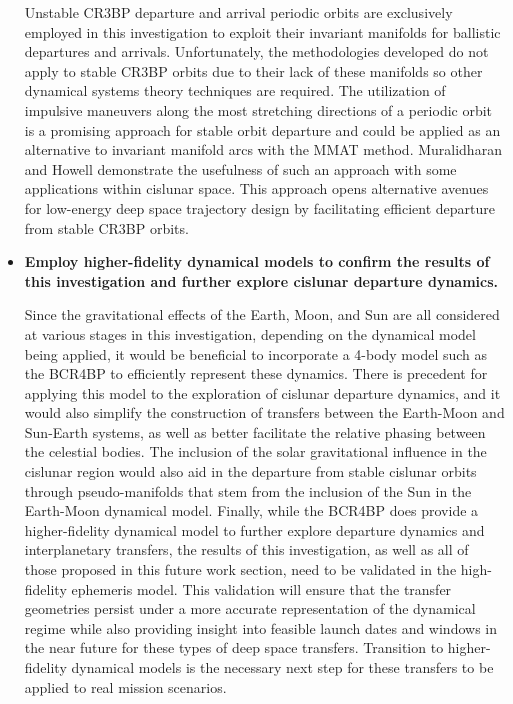\begin{itemize}
            Unstable CR3BP departure and arrival periodic orbits are exclusively employed in this
            investigation to exploit their invariant manifolds for ballistic departures and
            arrivals. Unfortunately, the methodologies developed do not apply to stable CR3BP
            orbits due to their lack of these manifolds so other dynamical systems theory
            techniques are required. The utilization of impulsive maneuvers along the most
            stretching directions of a periodic orbit is a promising approach for stable orbit
            departure and could be applied as an alternative to invariant manifold arcs with the
            MMAT method. Muralidharan and Howell demonstrate the usefulness of such an approach
            with some applications within cislunar space\cite{Muralidharan:2022}. This approach
            opens alternative avenues for low-energy deep space trajectory design by facilitating
            efficient departure from stable CR3BP orbits.
    \item   \textbf{Employ higher-fidelity dynamical models to confirm the results of this
            investigation and further explore cislunar departure dynamics.}

            Since the gravitational effects of the Earth, Moon, and Sun are all considered at
            various stages in this investigation, depending on the dynamical model being applied,
            it would be beneficial to incorporate a 4-body model such as the BCR4BP to efficiently
            represent these dynamics. There is precedent for applying this model to the exploration
            of cislunar departure dynamics, and it would also simplify the construction of
            transfers between the Earth-Moon and Sun-Earth systems, as well as better facilitate
            the relative phasing between the celestial bodies\cite{Boudad:2021,Boudad:2022}. The
            inclusion of the solar gravitational influence in the cislunar region would also aid in
            the departure from stable cislunar orbits through pseudo-manifolds that stem from the
            inclusion of the Sun in the Earth-Moon dynamical model. Finally, while the BCR4BP does
            provide a higher-fidelity dynamical model to further explore departure dynamics and
            interplanetary transfers, the results of this investigation, as well as all of those
            proposed in this future work section, need to be validated in the high-fidelity
            ephemeris model. This validation will ensure that the transfer geometries persist
            under a more accurate representation of the dynamical regime while also providing
            insight into feasible launch dates and windows in the near future for these types of
            deep space transfers. Transition to higher-fidelity dynamical models is the necessary
            next step for these transfers to be applied to real mission scenarios.
\end{itemize}
